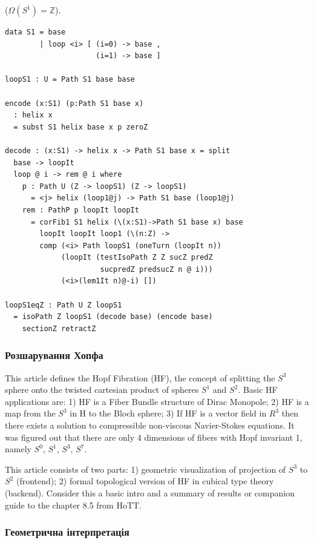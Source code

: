 \begin{theorem} ($\Omega(S^1)=\mathbb{Z}$).
\begin{lstlisting}
data S1 = base
        | loop <i> [ (i=0) -> base ,
                     (i=1) -> base ]

loopS1 : U = Path S1 base base

encode (x:S1) (p:Path S1 base x)
  : helix x
  = subst S1 helix base x p zeroZ

decode : (x:S1) -> helix x -> Path S1 base x = split
  base -> loopIt
  loop @ i -> rem @ i where
    p : Path U (Z -> loopS1) (Z -> loopS1)
      = <j> helix (loop1@j) -> Path S1 base (loop1@j)
    rem : PathP p loopIt loopIt
      = corFib1 S1 helix (\(x:S1)->Path S1 base x) base
        loopIt loopIt loop1 (\(n:Z) ->
        comp (<i> Path loopS1 (oneTurn (loopIt n))
             (loopIt (testIsoPath Z Z sucZ predZ
                      sucpredZ predsucZ n @ i)))
             (<i>(lem1It n)@-i) [])

loopS1eqZ : Path U Z loopS1
  = isoPath Z loopS1 (decode base) (encode base)
    sectionZ retractZ
\end{lstlisting}
\end{theorem}

\subsubsection{Розшарування Хопфа}

This article defines the Hopf Fibration (HF), the concept
of splitting the $S^3$ sphere onto the twisted cartesian product
of spheres $S^1$ and $S^2$.
Basic HF applications are:
1) HF is a Fiber Bundle structure of Dirac Monopole;
2) HF is a map from the $S^3$ in H to the Bloch sphere;
3) If HF is a vector field in $R^3$ then there exists a solution
to compressible non-viscous Navier-Stokes equations.
It was figured out that there are only
4 dimensions of fibers with Hopf invariant 1, namely
$S^0$, $S^1$, $S^3$, $S^7$.

This article consists of two parts:
1) geometric visualization of projection of $S^3$ to $S^2$ (frontend);
2) formal topological version of HF in cubical type theory (backend).
Consider this a basic intro and a summary of results or companion
guide to the chapter 8.5 from HoTT.

\subsubsection*{Геометрична інтерпретація}


